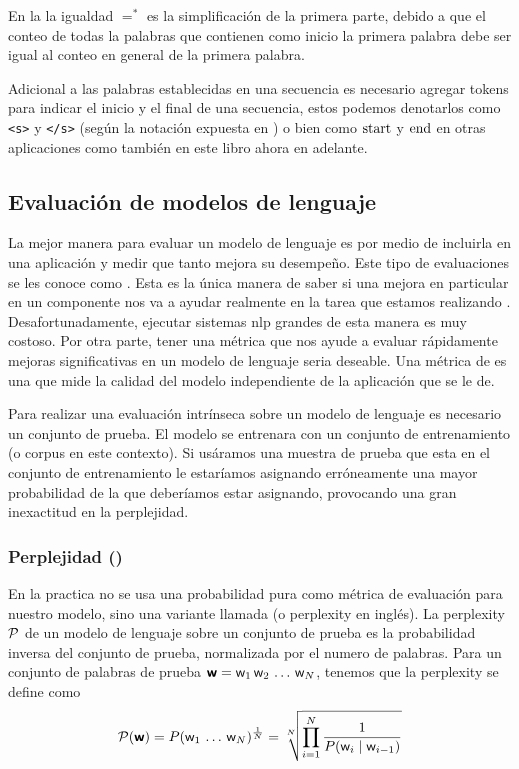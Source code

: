 En la  la igualdad $=^{\ast}$ es la simplificación de la primera parte, debido a que el conteo de todas la palabras que contienen como inicio la primera palabra debe ser igual al conteo en general de la primera palabra.

Adicional a las palabras establecidas en una secuencia es necesario agregar tokens para indicar el inicio y el final de una secuencia, estos podemos denotarlos como \texttt{<s>} y \texttt{</s>} (según la notación expuesta en \cite{jurafsky-martin}) o bien como $\mathrm{start}$ y $\mathrm{end}$ en otras aplicaciones como también en este libro ahora en adelante.

\subsection{Evaluación de modelos de lenguaje}
La mejor manera para evaluar un modelo de lenguaje es por medio de incluirla en una aplicación y medir que tanto mejora su desempeño. Este tipo de evaluaciones se les conoce como . Esta es la única manera de saber si una mejora en particular en un componente nos va a ayudar realmente en la tarea que estamos realizando \cite{jurafsky-martin}. Desafortunadamente, ejecutar sistemas \gls{nlp} grandes de esta manera es muy costoso. Por otra parte, tener una métrica que nos ayude a evaluar rápidamente mejoras significativas en un modelo de lenguaje seria deseable. Una métrica de  es una que mide la calidad del modelo independiente de la aplicación que se le de.

Para realizar una evaluación intrínseca sobre un modelo de lenguaje es necesario un conjunto de prueba. El modelo se entrenara con un conjunto de entrenamiento (o \gls{corpus} en este contexto). Si usáramos una muestra de prueba que esta en el conjunto de entrenamiento le estaríamos asignando erróneamente una mayor probabilidad de la que deberíamos estar asignando, provocando una gran inexactitud en la perplejidad.

\subsubsection{Perplejidad ()}
En la practica no se usa una probabilidad pura como métrica de evaluación para nuestro modelo, sino una variante llamada  (o \gls{perplexity} en inglés). La \gls{perplexity} $\mathcal{P}$ de un modelo de lenguaje sobre un conjunto de prueba es la probabilidad inversa del conjunto de prueba, normalizada por el numero de palabras. Para un conjunto de palabras de prueba ${\bm{\mathit{\mathsf{w}}}} = {\mathit{\mathsf{w}}}_1 \, {\mathit{\mathsf{w}}}_2 \, \ldots \, {\mathit{\mathsf{w}}}_N$, tenemos que la \gls{perplexity} se define como
\begin{equation} \label{eq:perplexity-def}
  \mathcal{P}({\bm{\mathit{\mathsf{w}}}}) = P({\mathit{\mathsf{w}}}_1 \, \ldots \, {\mathit{\mathsf{w}}}_N)^{\frac{1}{N}} = \sqrt[N]{\prod_{i=1}^{N} \frac{1}{P({\mathit{\mathsf{w}}}_i \mid {\mathit{\mathsf{w}}}_{i-1})}}
\end{equation}

